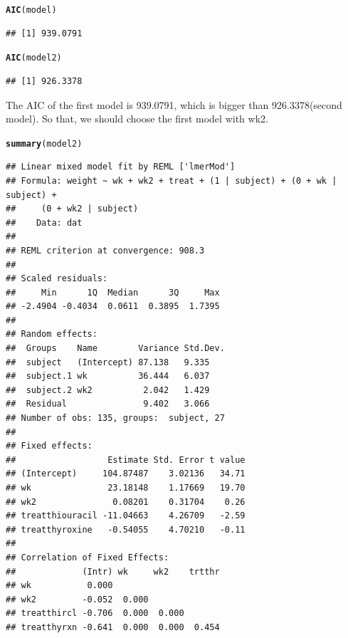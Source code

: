\documentclass{article}\usepackage[]{graphicx}\usepackage[]{color}
\makeatletter
\newcommand{\hlstd}[1]{\textcolor[rgb]{0.345,0.345,0.345}{#1}}%
\newcommand{\hlkwd}[1]{\textcolor[rgb]{0.737,0.353,0.396}{\textbf{#1}}}%
\newenvironment{kframe}{%
 \def\at@end@of@kframe{}%
 \ifinner\ifhmode%
  \def\at@end@of@kframe{\end{minipage}}%
  \begin{minipage}{\columnwidth}%
 \fi\fi%
 \def\FrameCommand##1{\hskip\@totalleftmargin \hskip-\fboxsep
 \colorbox{shadecolor}{##1}\hskip-\fboxsep
     \hskip-\linewidth \hskip-\@totalleftmargin \hskip\columnwidth}%
 \MakeFramed {\advance\hsize-\width
   \@totalleftmargin\z@ \linewidth\hsize
   \@setminipage}}%
 {\par\unskip\endMakeFramed%
 \at@end@of@kframe}
\newenvironment{knitrout}{}{} %
\makeatother
\begin{document}
\begin{enumerate}[(a)]
\begin{knitrout}
\color{fgcolor}\begin{kframe}
\begin{alltt}
  \hlkwd{AIC}\hlstd{(model)}
\end{alltt}
\begin{verbatim}
## [1] 939.0791
\end{verbatim}
\begin{alltt}
  \hlkwd{AIC}\hlstd{(model2)}
\end{alltt}
\begin{verbatim}
## [1] 926.3378
\end{verbatim}
\end{kframe}
\end{knitrout}

\qquad The AIC of the first model is 939.0791, which is bigger than 926.3378(second model). So that, we should choose the first model with wk2.

\begin{knitrout}
\color{fgcolor}\begin{kframe}
\begin{alltt}
  \hlkwd{summary}\hlstd{(model2)}
\end{alltt}
\begin{verbatim}
## Linear mixed model fit by REML ['lmerMod']
## Formula: weight ~ wk + wk2 + treat + (1 | subject) + (0 + wk | subject) +  
##     (0 + wk2 | subject)
##    Data: dat
## 
## REML criterion at convergence: 908.3
## 
## Scaled residuals: 
##     Min      1Q  Median      3Q     Max 
## -2.4904 -0.4034  0.0611  0.3895  1.7395 
## 
## Random effects:
##  Groups    Name        Variance Std.Dev.
##  subject   (Intercept) 87.138   9.335   
##  subject.1 wk          36.444   6.037   
##  subject.2 wk2          2.042   1.429   
##  Residual               9.402   3.066   
## Number of obs: 135, groups:  subject, 27
## 
## Fixed effects:
##                  Estimate Std. Error t value
## (Intercept)     104.87487    3.02136   34.71
## wk               23.18148    1.17669   19.70
## wk2               0.08201    0.31704    0.26
## treatthiouracil -11.04663    4.26709   -2.59
## treatthyroxine   -0.54055    4.70210   -0.11
## 
## Correlation of Fixed Effects:
##             (Intr) wk     wk2    trtthr
## wk           0.000                     
## wk2         -0.052  0.000              
## treatthircl -0.706  0.000  0.000       
## treatthyrxn -0.641  0.000  0.000  0.454
\end{verbatim}
\end{kframe}
\end{knitrout}


\end{enumerate}
\end{document}
